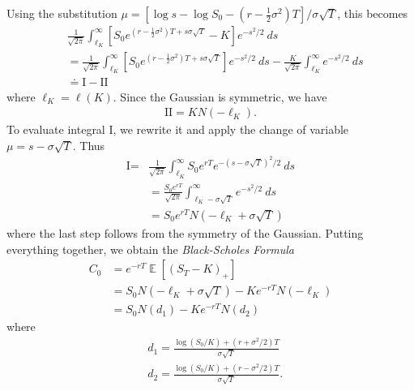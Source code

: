 \documentclass[12pt]{amsbook}
\DeclareMathOperator{\ex}{\mathbb{E}}
\theoremstyle{plain}
\theoremstyle{definition}
\theoremstyle{remark}
\numberwithin{equation}{section}  %
\begin{document}
Using the substitution $\mu = \left [ \log s - \log S_{0} - (r - \frac{1}{2}
\sigma^{2})T \right ]/\sigma \sqrt{T}$, this becomes
\begin{equation*}
	\begin{split}
		& \frac{1}{\sqrt{2 \pi}} \int_{\ell_{K}}^{\infty}
		\left [ S_{0}e^{(r - \frac{1}{2} \sigma^{2})T + s \sigma \sqrt{T}} - K
		\right ] e^{-s^{2}/2} \ ds
		\\
		& =
		\frac{1}{\sqrt{2 \pi}} \int_{\ell_{K}}^{\infty}
		\left [ S_{0}e^{(r - \frac{1}{2} \sigma^{2})T + s \sigma \sqrt{T}}
		\right ] e^{-s^{2}/2} \ ds
		- 
		\frac{K}{\sqrt{2 \pi}} \int_{\ell_{K}}^{\infty} e^{-s^{2}/2} \ ds
		\\
		& \doteq \text{I} - \text{II}
	\end{split}
\end{equation*}
where $\ell_{K} = \ell(K)$.
Since the Gaussian is symmetric, we have
\begin{equation*}
	\begin{split}
		\text{II} = K N(-\ell_{K}).
	\end{split}
\end{equation*}
To evaluate integral I, we rewrite it and apply the change of 
variable $\mu = s - \sigma \sqrt{T}$. Thus
\begin{equation*}
	\begin{split}
		\text{I} = 
		& \frac{1}{\sqrt{2 \pi}} \int_{\ell_{K}}^{\infty}
		S_{0}e^{rT}
		e^{-(s- \sigma \sqrt{T})^{2}/2} \ ds
		\\
		& = \frac{S_{0} e^{rT}}{\sqrt{2 \pi}} \int_{\ell_{K} - \sigma \sqrt{T}}^{\infty}
		e^{-s^{2}/2} \ ds
		\\
		& = S_{0}e^{rT} N(-\ell_{K} + \sigma \sqrt{T})
	\end{split}
\end{equation*}
where the last step follows from the symmetry of the Gaussian.
Putting everything together, we obtain the \emph{Black-Scholes Formula}
\begin{equation*}
	\begin{split}
		C_{0} & =  e^{-rT} \ex \left [{\left( S_{T} - K \right)}_{+} \right ]
		\\
		& = S_{0}N(-\ell_{K} + \sigma \sqrt{T}) - Ke^{-rT} N(-\ell_{K})
		\\
		& = S_{0}N(d_{1}) - Ke^{-rT} N(d_{2})
	\end{split}
\end{equation*}
where 
\begin{equation*}
	\begin{split}
		& d_{1} = \frac{\log(S_{0}/K) + (r + \sigma^{2}/2)T}{\sigma \sqrt{T}}
		\\
		& d_{2} = \frac{\log(S_{0}/K) + (r - \sigma^{2}/2)T}{\sigma \sqrt{T}}.
	\end{split}
\end{equation*}


\end{document}
